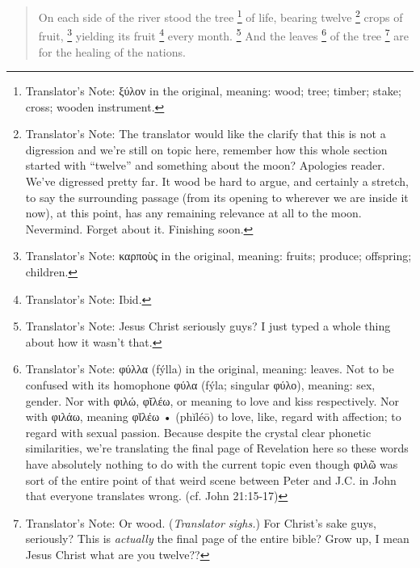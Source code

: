 {{                \begin{quote}
                On each side of the river stood the tree%
                \footnote{
                    Translator's Note: ξύλον in the original, meaning: wood; tree; timber; stake; cross; wooden instrument.
                }
                of life, bearing twelve%
                \footnote{
                    Translator's Note: The translator would like the clarify that this is not a digression
                    and we're still on topic here, remember how this whole section started with ``twelve''
                    and something about the moon? Apologies reader. We've digressed pretty far.
                    It wood be hard to argue, and certainly a stretch, to say the surrounding passage
                    (from its opening to wherever we are inside it now), at this point, has any remaining
                    relevance at all to the moon. Nevermind. Forget about it. Finishing soon.
                }
                crops of fruit,%
                \footnote{
                    Translator's Note: καρποὺς in the original, meaning: fruits; produce; offspring; children.
                }
                yielding its fruit%
                \footnote{
                    Translator's Note: Ibid.
                }
                every month.%
                \footnote{
                    Translator's Note: Jesus Christ seriously guys? I just typed a whole thing about how it wasn't that.
                }
                And the leaves%
                \footnote{
                    Translator's Note: φύλλα (fýlla) in the original, meaning: leaves.
                    Not to be confused with its homophone φύλα (fýla; singular φύλο), meaning: sex, gender.
                    Nor with φιλώ, φῐλέω, or meaning to love and kiss respectively.
                    Nor with φιλάω, meaning φῐλέω • (phĭléō) to love, like, regard with affection; to regard with sexual passion.
                    Because despite the crystal clear phonetic similarities, we're translating the final page of Revelation here
                    so these words have absolutely nothing to do with the current topic even though φιλῶ was sort of the entire
                    point of that weird scene between Peter and J.C. in John that everyone translates wrong.
                    (cf. John 21:15-17)
                }
                of the tree%
                \footnote{
                    Translator's Note: Or wood. (\textsl{Translator sighs.}) For Christ's sake guys, seriously?
                    This is \textit{actually} the final page of the entire bible?
                    Grow up, I mean Jesus Christ what are you twelve??
                }
                are for the healing of the nations.
                \end{quote}

}}
